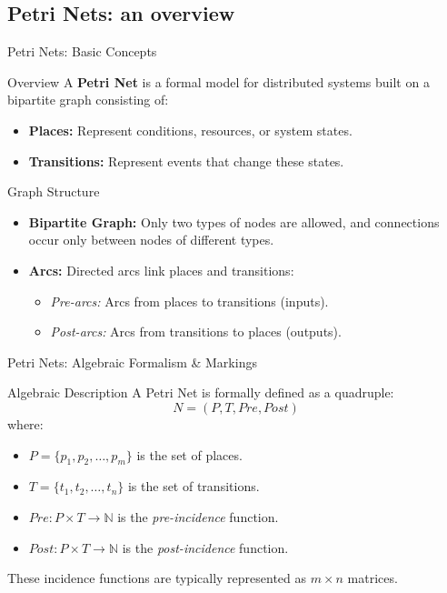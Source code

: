 \documentclass{beamer}
\begin{document}
\subsection{Petri Nets: an overview}
\begin{frame}{Petri Nets: Basic Concepts}
    \footnotesize
    \begin{block}{Overview}
        A \textbf{Petri Net} is a formal model for distributed systems built on a bipartite graph consisting of:
        \begin{itemize}
            \item \textbf{Places:} Represent conditions, resources, or system states.
            \item \textbf{Transitions:} Represent events that change these states.
        \end{itemize}
    \end{block}

    \begin{block}{Graph Structure}
        \begin{itemize}
            \item \textbf{Bipartite Graph:} Only two types of nodes are allowed, and connections occur only between nodes of different types.
            \item \textbf{Arcs:} Directed arcs link places and transitions:
                  \begin{itemize}
                      \item \textit{Pre-arcs:} Arcs from places to transitions (inputs).
                      \item \textit{Post-arcs:} Arcs from transitions to places (outputs).
                  \end{itemize}
        \end{itemize}
    \end{block}
\end{frame}

\begin{frame}{Petri Nets: Algebraic Formalism \& Markings}
    \footnotesize
    \begin{block}{Algebraic Description}
        A Petri Net is formally defined as a quadruple:
        \[
            N = (P, T, Pre, Post)
        \]
        where:
        \begin{itemize}
            \item \(P=\{p_1, p_2, \dots, p_m\}\) is the set of places.
            \item \(T=\{t_1, t_2, \dots, t_n\}\) is the set of transitions.
            \item \(Pre: P \times T \rightarrow \mathbb{N}\) is the \emph{pre-incidence} function.
            \item \(Post: P \times T \rightarrow \mathbb{N}\) is the \emph{post-incidence} function.
        \end{itemize}
        These incidence functions are typically represented as \(m \times n\) matrices.
    \end{block}

\end{frame}
\end{document}
